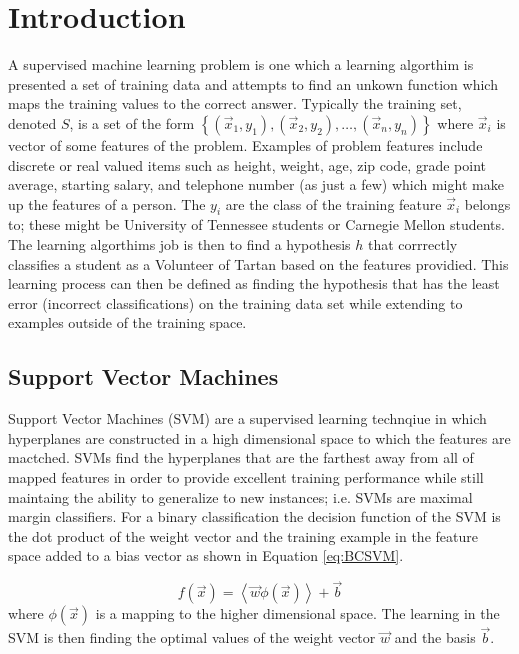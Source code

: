 \section{Introduction}

A supervised machine learning problem is one which a learning algorthim is presented a set of training data and attempts to find an unkown function which maps the training values to the correct answer.
Typically the training set, denoted $S$, is a set of the form $\left \{ (\vec{x}_1,y_1), (\vec{x}_2,y_2), \dots, (\vec{x}_n,y_n) \right \}$ where $\vec{x}_i$ is vector of some features of the problem.
Examples of problem features include discrete or real valued items such as height, weight, age, zip code, grade point average, starting salary, and telephone number (as just a few)  which might make up the features of a person.
The $y_i$ are the class of the training feature $\vec{x}_i$ belongs to; these might be University of Tennessee students or Carnegie Mellon students.
The learning algorthims job is then to find a hypothesis $h$ that corrrectly classifies a student as a Volunteer of Tartan based on the features providied.
This learning process can then be defined as finding the hypothesis that has the least error (incorrect classifications) on the training data set while extending to examples outside of the training space.

\subsection{Support Vector Machines}
Support Vector Machines (SVM) are a supervised learning technqiue in which hyperplanes are constructed in a high dimensional space to which the features are mactched.
SVMs find the hyperplanes that are the farthest away from all of mapped features in order to provide excellent training performance while still maintaing the ability to generalize to new instances; i.e. SVMs are maximal margin classifiers.
For a binary classification the decision function of the SVM is the dot product of the weight vector and the training example in the feature space added to a bias vector as shown in Equation \ref{eq:BCSVM}.

\begin{equation}
\label{eq:BCSVM}
f \left ( \vec{x} \right ) = \left \langle \vec{w} \phi(\vec{x}) \right \rangle + \vec{b}
\end{equation}
where $\phi(\vec{x})$ is a mapping to the higher dimensional space.
The learning in the SVM is then finding the optimal values of the weight vector $\vec{w}$ and the basis $\vec{b}$.

